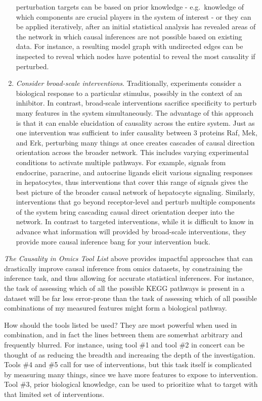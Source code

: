 \documentclass[journal=jacsat,manuscript=article]{achemso}
\begin{document}
\begin{enumerate}
perturbation targets can be based on prior knowledge - e.g.~knowledge of
which components are crucial players in the system of interest - or they
can be applied iteratively, after an initial statistical analysis has
revealed areas of the network in which causal inferences are not
possible based on existing data. For instance, a resulting model graph
with undirected edges can be inspected to reveal which nodes have
potential to reveal the most causality if perturbed.
\item \textit{Consider broad-scale interventions}. Traditionally, experiments consider
a biological response to a particular stimulus, possibly in the context
of an inhibitor. In contrast, broad-scale interventions sacrifice
specificity to perturb many features in the system simultaneously. The
advantage of this approach is that it can enable elucidation of
causality across the entire system. Just as one intervention was
sufficient to infer causality between 3 proteins Raf, Mek, and Erk,
perturbing many things at once creates cascades of causal direction
orientation across the broader network. This includes varying
experimental conditions to activate multiple pathways. For example,
signals from endocrine, paracrine, and autocrine ligands elicit various
signaling responses in hepatocytes, thus interventions that cover this
range of signals gives the best picture of the broader causal network of
hepatocyte signaling. Similarly, interventions that go beyond
receptor-level and perturb multiple components of the system bring
cascading causal direct orientation deeper into the network. In contrast
to targeted interventions, while it is difficult to know in advance what
information will provided by broad-scale interventions, they provide
more causal inference bang for your intervention buck.
\end{enumerate}

\textit{The Causality in Omics Tool List} above provides impactful approaches
that can drastically improve causal inference from omics datasets, by
constraining the inference task, and thus allowing for accurate
statistical inferences. For instance, the task of assessing which of all
the possible KEGG pathways is present in a dataset will be far less
error-prone than the task of assessing which of all possible
combinations of my measured features might form a biological pathway.

How should the tools listed be used? They are most powerful when used in
combination, and in fact the lines between them are somewhat arbitrary
and frequently blurred. For instance, using tool \#1 and tool \#2 in
concert can be thought of as reducing the breadth and increasing the
depth of the investigation. Tools \#4 and \#5 call for use of
interventions, but this task itself is complicated by measuring many
things, since we have more features to expose to intervention. Tool
\#3, prior biological knowledge, can be used to prioritize what to
target with that limited set of interventions.
\end{document}
